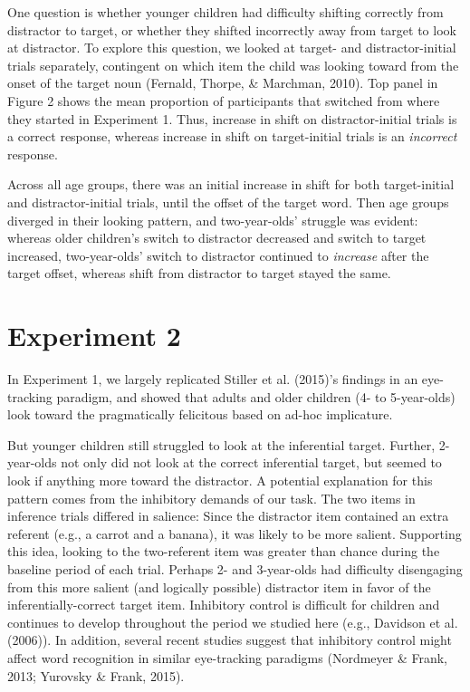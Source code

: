 \documentclass[a4paper,man,apacite,floatsintext]{apa6}
\begin{document}
One question is whether younger children had difficulty shifting
correctly from distractor to target, or whether they shifted incorrectly
away from target to look at distractor. To explore this question, we
looked at target- and distractor-initial trials separately, contingent
on which item the child was looking toward from the onset of the target
noun (Fernald, Thorpe, \& Marchman, 2010). Top panel in Figure 2 shows
the mean proportion of participants that switched from where they
started in Experiment 1. Thus, increase in shift on distractor-initial
trials is a correct response, whereas increase in shift on
target-initial trials is an \emph{incorrect} response.

Across all age groups, there was an initial increase in shift for both
target-initial and distractor-initial trials, until the offset of the
target word. Then age groups diverged in their looking pattern, and
two-year-olds' struggle was evident: whereas older children's switch to
distractor decreased and switch to target increased, two-year-olds'
switch to distractor continued to \emph{increase} after the target
offset, whereas shift from distractor to target stayed the same.

\section{Experiment 2}\label{experiment-2}

In Experiment 1, we largely replicated Stiller et al. (2015)'s findings
in an eye-tracking paradigm, and showed that adults and older children
(4- to 5-year-olds) look toward the pragmatically felicitous based on
ad-hoc implicature.

But younger children still struggled to look at the inferential target.
Further, 2-year-olds not only did not look at the correct inferential
target, but seemed to look if anything more toward the distractor. A
potential explanation for this pattern comes from the inhibitory demands
of our task. The two items in inference trials differed in salience:
Since the distractor item contained an extra referent (e.g., a carrot
and a banana), it was likely to be more salient. Supporting this idea,
looking to the two-referent item was greater than chance during the
baseline period of each trial. Perhaps 2- and 3-year-olds had difficulty
disengaging from this more salient (and logically possible) distractor
item in favor of the inferentially-correct target item. Inhibitory
control is difficult for children and continues to develop throughout
the period we studied here (e.g., Davidson et al. (2006)). In addition,
several recent studies suggest that inhibitory control might affect word
recognition in similar eye-tracking paradigms (Nordmeyer \& Frank, 2013;
Yurovsky \& Frank, 2015).
\end{document}
